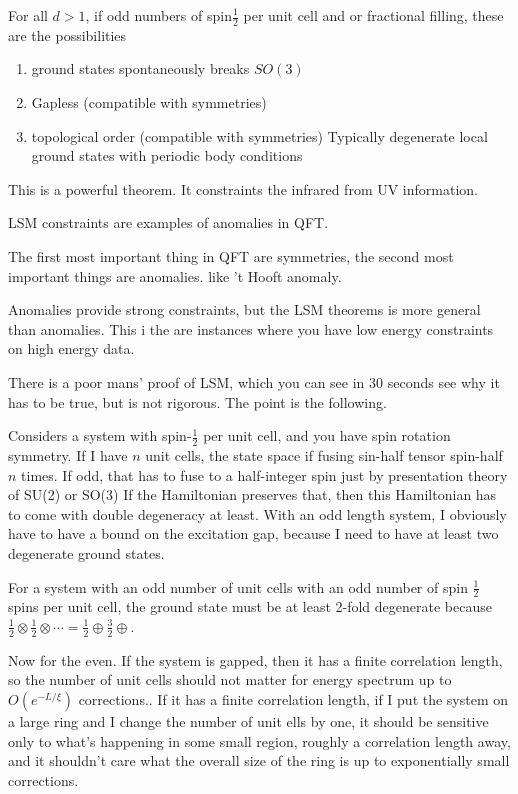 For all $d>1$,
if odd numbers of spin$\frac{1}{2}$ per unit cell and or fractional filling,
these are the possibilities
\begin{enumerate}
    \item ground states spontaneously breaks $SO(3)$\\
    \item Gapless (compatible with symmetries)\\
    \item topological order (compatible with symmetries)
        Typically degenerate local ground states with periodic body conditions
\end{enumerate}
This is a powerful theorem.
It constraints the infrared from UV information.

LSM constraints are examples of anomalies in QFT.

The first most important thing in QFT are symmetries,
the second most important things are anomalies.
like 't Hooft anomaly.

Anomalies provide strong constraints,
but the LSM theorems is more general than anomalies.
This i the are instances where you have low energy constraints on high energy
data.

There is a poor mans' proof of LSM,
which you can see in 30 seconds see why it has to be true,
but is not rigorous.
The point is the following.

Considers a system with spin-$\frac{1}{2}$ per unit cell,
and you have spin rotation symmetry.
If I have $n$ unit cells,
the state space if fusing sin-half tensor spin-half $n$ times.
If odd,
that has to fuse to a half-integer spin just by presentation theory of SU(2) or
SO(3)
If the Hamiltonian preserves that,
then this Hamiltonian has to come with double degeneracy at least.
With an odd length system,
I obviously have to have a bound on the excitation gap,
because I need to have at least two degenerate ground states.

For a system with an odd number of unit cells with an odd number
of spin $\frac{1}{2}$ spins per unit cell,
the ground state must be at least 2-fold degenerate because
$\frac{1}{2}\otimes \frac{1}{2}\otimes
\cdots
= \frac{1}{2}\oplus \frac{3}{2} \oplus$.

Now for the even.
If the system is gapped,
then it has a finite correlation length,
so the number of unit cells should not matter for energy spectrum up to
$O\left( e^{-L/\xi} \right)$ corrections..
If it has a finite correlation length,
if I put the system on a large ring
and I change the number of  unit ells by one,
it should be sensitive only to what's happening in some small region,
roughly a correlation length away,
and it shouldn't care what the overall size of the ring is up to exponentially
small corrections.


